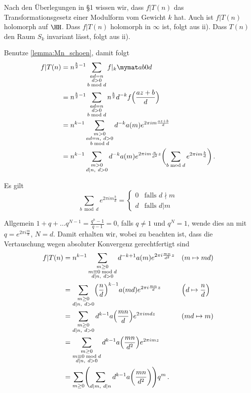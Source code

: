 \begin{bewe-list}
\item Nach den Überlegungen in §1 wissen wir, dass $f | T(n)$ das Transformationsgesetz einer Modulform vom Gewicht $k$ hat. Auch ist $f | T(n)$ holomorph auf $\HH$. Dass $f | T(n)$ holomorph in $\infty$ ist, folgt aus ii). Dass $T(n)$ den Raum $S_k$ invariant lässt, folgt aus ii).

\item Benutze \autoref{lemma:Mn_schoen}, damit folgt
\begin{align*}
	f|T(n)
	&= n^{\frac{k}{2}-1} \sum_{\substack{ad=n\\ d>0 \\ b\bmod d}} f|_k \mymat ab0d \\
	&= n^{\frac{k}{2}-1} \sum_{\substack{ad=n\\ d>0 \\ b\bmod d}} n^{\frac{k}{2}} d^{-k} f\Bigl(\frac{az+b}{d}\Bigr) \\
	&= n^{k-1} \sum_{\substack{m>0\\ ad=n,\ d>0\\ b\bmod d}} d^{-k} a(m) e^{2\pi im \frac{az+b}{d}} \\
	&= n^{k-1} \sum_{\substack{m>0\\ d|n,\ d>0}} d^{-k} a(m) e^{2\pi im \frac{n}{d^2}z} \biggl( \sum_{b\bmod d} e^{2\pi im \frac{b}{d}}\biggr)
	\,.
\end{align*}

Es gilt
\[
	\sum_{b \bmod d} e^{2\pi im \frac{b}{d}}
	= \begin{cases}
		0 & \text{falls } d\nmid m \\
		d & \text{falls } d| m
	  \end{cases}
\]

Allgemein $1+q+\ldots q^{N-1} = \frac{q^n-1}{q-1} = 0$, falls $q\not=1$ und $q^N = 1$, wende dies an mit $q=e^{2\pi i \frac{m}{d}}$, $N=d$.
Damit erhalten wir, wobei zu beachten ist, dass die Vertauschung wegen absoluter Konvergenz gerechtfertigt sind
\begin{align*}
	f|T(n)
	&= n^{k-1} \sum_{\substack{m \geq 0 \\ m \equiv 0 \bmod d \\ d|n,\ d > 0}} d^{-k+1} a(m) e^{2\pi i\frac{mn}{d^2}z} &&(m\mapsto md) \\
	&= \sum_{\substack{m \geq 0\\ d|n,\ d>0}} \Bigl(\frac{n}{d}\Bigr)^{k-1} a(md) e^{2\pi i \frac{mn}{d}z} &&\Bigl(d\mapsto\frac{n}{d}\Bigr) \\
	&= \sum_{\substack{m \geq 0 \\ d|n,\ d>0}} d^{k-1} a\Bigl(\frac{mn}{d}\Bigr) e^{2\pi imdz} && (md\mapsto m) \\
	&= \sum_{\substack{m\geq 0 \\ m\equiv 0 \bmod d \\ d|n,\ d>0}} d^{k-1} a\Bigl(\frac{mn}{d^2}\Bigr) e^{2\pi imz} \\
	&= \sum_{m\geq 0} \Biggl(\sum_{d|m,\ d|n} d^{k-1} a\biggl(\frac{mn}{d^2}\biggr)\Biggr) q^m
	\,.
\end{align*}
\end{bewe-list}


